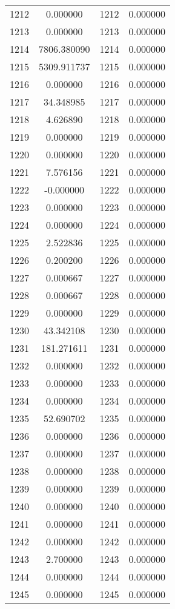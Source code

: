 \documentclass[12pt]{article}
\begin{document}
\begin{longtable}{@{}cccc@{}}
1212 & 0.000000 & 1212 & 0.000000 \\
1213 & 0.000000 & 1213 & 0.000000 \\
1214 & 7806.380090 & 1214 & 0.000000 \\
1215 & 5309.911737 & 1215 & 0.000000 \\
1216 & 0.000000 & 1216 & 0.000000 \\
1217 & 34.348985 & 1217 & 0.000000 \\
1218 & 4.626890 & 1218 & 0.000000 \\
1219 & 0.000000 & 1219 & 0.000000 \\
1220 & 0.000000 & 1220 & 0.000000 \\
1221 & 7.576156 & 1221 & 0.000000 \\
1222 & -0.000000 & 1222 & 0.000000 \\
1223 & 0.000000 & 1223 & 0.000000 \\
1224 & 0.000000 & 1224 & 0.000000 \\
1225 & 2.522836 & 1225 & 0.000000 \\
1226 & 0.200200 & 1226 & 0.000000 \\
1227 & 0.000667 & 1227 & 0.000000 \\
1228 & 0.000667 & 1228 & 0.000000 \\
1229 & 0.000000 & 1229 & 0.000000 \\
1230 & 43.342108 & 1230 & 0.000000 \\
1231 & 181.271611 & 1231 & 0.000000 \\
1232 & 0.000000 & 1232 & 0.000000 \\
1233 & 0.000000 & 1233 & 0.000000 \\
1234 & 0.000000 & 1234 & 0.000000 \\
1235 & 52.690702 & 1235 & 0.000000 \\
1236 & 0.000000 & 1236 & 0.000000 \\
1237 & 0.000000 & 1237 & 0.000000 \\
1238 & 0.000000 & 1238 & 0.000000 \\
1239 & 0.000000 & 1239 & 0.000000 \\
1240 & 0.000000 & 1240 & 0.000000 \\
1241 & 0.000000 & 1241 & 0.000000 \\
1242 & 0.000000 & 1242 & 0.000000 \\
1243 & 2.700000 & 1243 & 0.000000 \\
1244 & 0.000000 & 1244 & 0.000000 \\
1245 & 0.000000 & 1245 & 0.000000 \\

\end{longtable}
\end{document}
